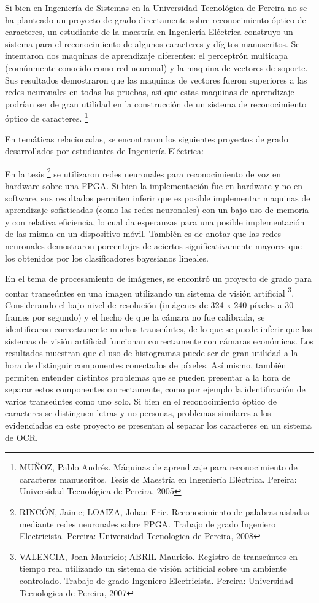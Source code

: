 \documentclass[a4paper, 11pt, oneside]{report}
\begin{document}
Si bien en Ingeniería de Sistemas en la Universidad Tecnológica de Pereira no se ha planteado un proyecto de grado directamente sobre reconocimiento óptico de caracteres, un estudiante de la maestría en Ingeniería Eléctrica construyo un sistema para el reconocimiento de algunos caracteres y dígitos manuscritos. Se intentaron dos maquinas de aprendizaje diferentes: el perceptrón multicapa (comúnmente conocido como red neuronal) y la maquina de vectores de soporte. Sus resultados demostraron que las maquinas de vectores fueron superiores a las redes neuronales en todas las pruebas, así que estas maquinas de aprendizaje podrían ser de gran utilidad en la construcción de un sistema de reconocimiento óptico de caracteres. \footnote{MUÑOZ, Pablo Andrés. Máquinas de aprendizaje para reconocimiento de caracteres manuscritos. Tesis de Maestría en Ingeniería Eléctrica. Pereira: Universidad Tecnológica de Pereira, 2005}

En temáticas relacionadas, se encontraron los siguientes proyectos de grado desarrollados por estudiantes de Ingeniería Eléctrica:
    
En la tesis \footnote{RINCÓN, Jaime; LOAIZA, Johan Eric. Reconocimiento de palabras aisladas mediante redes neuronales sobre FPGA. Trabajo de grado Ingeniero Electricista. Pereira: Universidad Tecnologica de Pereira, 2008} se utilizaron redes neuronales para reconocimiento de voz en hardware sobre una FPGA. Si bien la implementación fue en hardware y no en software, sus resultados permiten inferir que es posible implementar maquinas de aprendizaje sofisticadas (como las redes neuronales) con un bajo uso de memoria y con relativa eficiencia, lo cual da esperanzas para una posible implementación de las misma en un dispositivo móvil. También es de anotar que las redes neuronales demostraron porcentajes de aciertos significativamente mayores que los obtenidos por los clasificadores bayesianos lineales.

En el tema de procesamiento de imágenes, se encontró un proyecto de grado para contar transeúntes en una imagen utilizando un sistema de visión artificial \footnote{VALENCIA, Joan Mauricio; ABRIL Mauricio. Registro de transeúntes en tiempo real utilizando un sistema de visión artificial sobre un ambiente controlado. Trabajo de grado Ingeniero Electricista. Pereira: Universidad Tecnologica de Pereira, 2007}. Considerando el bajo nivel de resolución (imágenes de 324 x 240 píxeles a 30 frames por segundo) y el hecho de que la cámara no fue calibrada, se identificaron correctamente muchos transeúntes, de lo que se puede inferir que los sistemas de visión artificial funcionan correctamente con cámaras económicas. Los resultados muestran que el uso de histogramas puede ser de gran utilidad a la hora de distinguir componentes conectados de píxeles. Así mismo, también permiten entender distintos problemas que se pueden presentar a la hora de separar estos componentes correctamente, como por ejemplo la identificación de varios transeúntes como uno solo. Si bien en el reconocimiento óptico de caracteres se distinguen letras y no personas, problemas similares a los evidenciados en este proyecto se presentan al separar los caracteres en un sistema de OCR.
	
\end{document}
